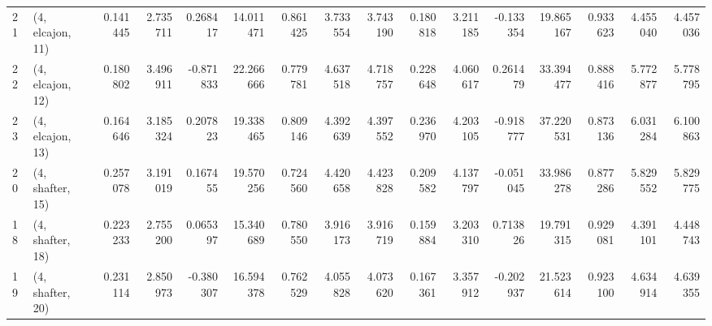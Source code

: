\begin{tabular}{llrrrrrrrrrrrrrr}
21 &  (4, elcajon, 11) &   0.141445 &  2.735711 &  0.268417 &  14.011471 &  0.861425 &   3.733554 &  3.743190 &  0.180818 &   3.211185 & -0.133354 &   19.865167 &  0.933623 &   4.455040 &   4.457036 \\
22 &  (4, elcajon, 12) &   0.180802 &  3.496911 & -0.871833 &  22.266666 &  0.779781 &   4.637518 &  4.718757 &  0.228648 &   4.060617 &  0.261479 &   33.394477 &  0.888416 &   5.772877 &   5.778795 \\
23 &  (4, elcajon, 13) &   0.164646 &  3.185324 &  0.207823 &  19.338465 &  0.809146 &   4.392639 &  4.397552 &  0.236970 &   4.203105 & -0.918777 &   37.220531 &  0.873136 &   6.031284 &   6.100863 \\
20 &  (4, shafter, 15) &   0.257078 &  3.191019 &  0.167455 &  19.570256 &  0.724560 &   4.420658 &  4.423828 &  0.209582 &   4.137797 & -0.051045 &   33.986278 &  0.877286 &   5.829552 &   5.829775 \\
18 &  (4, shafter, 18) &   0.223233 &  2.755200 &  0.065397 &  15.340689 &  0.780550 &   3.916173 &  3.916719 &  0.159884 &   3.203310 &  0.713826 &   19.791315 &  0.929081 &   4.391101 &   4.448743 \\
19 &  (4, shafter, 20) &   0.231114 &  2.850973 & -0.380307 &  16.594378 &  0.762529 &   4.055828 &  4.073620 &  0.167361 &   3.357912 & -0.202937 &   21.523614 &  0.923100 &   4.634914 &   4.639355 \\
\bottomrule
\end{tabular}
